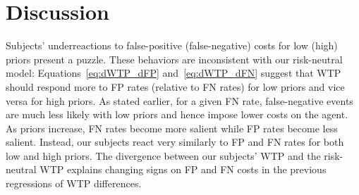\documentclass[12pt,a4paper]{article}
\begin{document}



\section{Discussion}\label{sec:discussion}


Subjects' underreactions to false-positive (false-negative) costs for low (high) priors present a puzzle. These behaviors are inconsistent with our risk-neutral model: Equations~\ref{eq:dWTP_dFP} and~\ref{eq:dWTP_dFN} suggest that WTP should respond more to FP rates (relative to FN rates) for low priors and vice versa for high priors. As stated earlier, for a given FN rate, false-negative events are much less likely with low priors and hence impose lower costs on the agent. As priors increase, FN rates become more salient while FP rates become less salient. Instead, our subjects react very similarly to FP and FN rates for both low and high priors. The divergence between our subjects' WTP and the risk-neutral WTP explains changing signs on FP and FN costs in the previous regressions of WTP differences.
\end{document}

